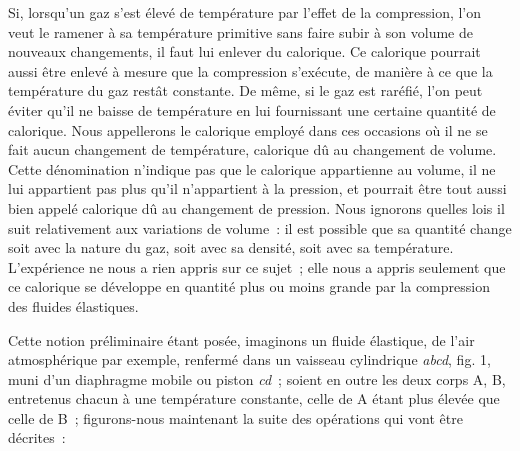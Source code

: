 \documentclass[french,twoside]{book} %
\begin{document}
Si, lorsqu’un gaz s’est élevé de température par l’effet de la compression, l’on veut le ramener à sa température primitive sans faire subir à son volume de nouveaux changements, il faut lui enlever du calorique. Ce calorique pourrait aussi être enlevé à mesure que la compression s’exécute, de manière à ce que la température du gaz restât constante. De même, si le gaz est raréfié, l’on peut éviter qu’il ne baisse de température en lui fournissant une certaine quantité de calorique. Nous appellerons le calorique employé dans ces occasions où il ne se fait aucun changement de température, calorique dû au changement de volume. Cette dénomination n’indique pas que le calorique appartienne au volume, il ne lui appartient pas plus qu’il n’appartient à la pression, et pourrait être tout aussi bien appelé calorique dû au changement de pression. Nous ignorons quelles lois il suit relativement aux variations de volume : il est possible que sa quantité change soit avec la nature du gaz, soit avec sa densité, soit avec sa température. L’expérience ne nous a rien appris sur ce sujet ; elle nous a appris seulement que ce calorique se développe en quantité plus ou moins grande par la compression des fluides élastiques.\par
Cette notion préliminaire étant posée, imaginons un fluide élastique, de l’air atmosphérique par exemple, renfermé dans un vaisseau cylindrique \emph{abcd}, fig. 1, muni d’un diaphragme mobile ou piston \emph{cd} ; soient en outre les deux corps A, B, entretenus chacun à une température constante, celle de A étant plus élevée que celle de B ; figurons-nous maintenant la suite des opérations qui vont être décrites :\par
\end{document}
